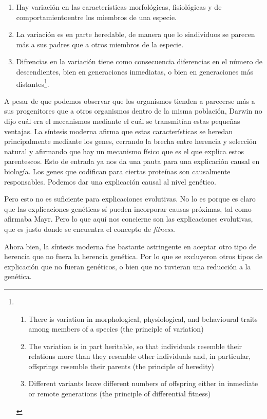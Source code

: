 \begin{enumerate}
  \item Hay variación en las características morfológicas, fisiológicas y de comportamientoentre los miembros de una especie.
  \item La variación es en parte heredable, de manera que lo sindividuos se parecen más a sus padres que a otros miembros de la especie.
  \item Difrencias en la variación tiene como consecuencia diferencias en el número de descendientes, bien en generaciones inmediatas, o bien en generaciones más distantes\footnote{
  \begin{enumerate}
    \item There is variation in morphological, physiological, and behavioural traits among members of a species (the principle of variation)
    \item The variation is in part heritable, so that individuals resemble their relations more than they resemble other individuals and, in particular, offsprings resemble their parents (the principle of heredity)
    \item Different variants leave different numbers of offspring either in inmediate or remote generations (the principle of differential fitness)
  \end{enumerate}
  }\cite{Godfrey-Smith2013}.
\end{enumerate}

A pesar de que podemos observar que los organismos tienden a parecerse más a sus progenitores que a otros organismos dentro de la misma población, Darwin no dijo cuál era el mecanismos mediante el cuál se transmitían estas pequeñas ventajas. La síntesis moderna afirma que estas características se heredan principalmente mediante los genes, cerrando la brecha entre herencia y selección natural y afirmando que hay un mecanismo físico que es el que explica estos parentescos. Esto de entrada ya nos da una pauta para una explicación causal en biología. Los genes que codifican para ciertas proteínas son causalmente responsables. Podemos dar una explicación causal al nivel genético.

Pero esto no es suficiente para explicaciones evolutivas. No lo es porque es claro que las explicaciones genéticas sí pueden incorporar causas próximas, tal como afirmaba Mayr. Pero lo que aquí nos concierne son las explicaciones evolutivas, que es justo donde se encuentra el concepto de \emph{fitness}.

Ahora bien, la síntesis moderna fue bastante astringente en aceptar otro tipo de herencia que no fuera la herencia genética. Por lo que se excluyeron otros tipos de explicación que no fueran genéticos, o bien que no tuvieran una reducción a la genética.


